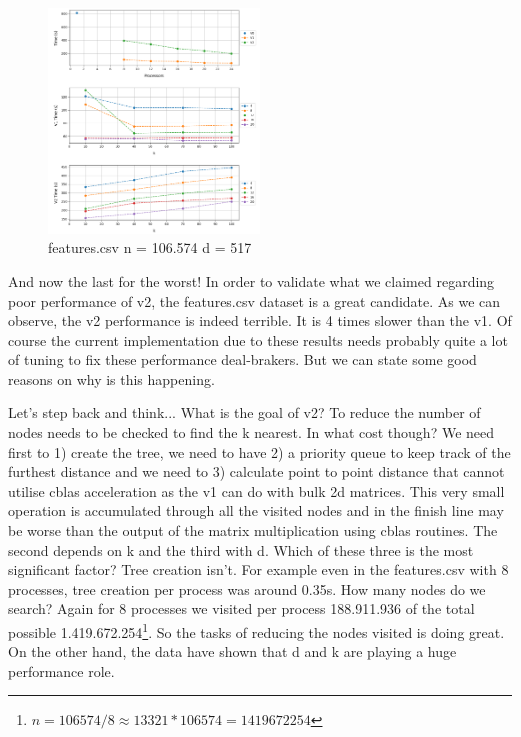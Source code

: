 \documentclass[12pt, a4paper]{article}
\begin{document}
\begin{figure}
    \centering
    \includegraphics[height=.2\textheight, width=0.5\textwidth, keepaspectratio]{assets/black_sheep.png}
    \caption{features.csv \newline n = 106.574 d = 517}
\end{figure}

And now the last for the worst! In order to validate what we claimed regarding poor performance of v2, the features.csv dataset is a great candidate. As we can observe, the v2 performance is indeed terrible. It is 4 times slower than the v1. Of course the current implementation due to these results needs probably quite a lot of tuning to fix these performance deal-brakers. But we can state some good reasons on why is this happening. 


Let's step back and think... What is the goal of v2? To reduce the number of nodes needs to be checked to find the k nearest. In what cost though? We need first to 1) create the tree, we need to have 2) a priority queue to keep track of the furthest distance and we need to 3) calculate point to point distance that cannot utilise cblas acceleration as the v1 can do with bulk 2d matrices. This very small operation is accumulated through all the visited nodes and in the finish line may be worse than the output of the matrix multiplication using cblas routines. The second depends on k and the third with d. Which of these three is the most significant factor? Tree creation isn't. For example even in the features.csv with 8 processes, tree creation per process was around 0.35s. How many nodes do we search? Again for 8 processes we visited per process 188.911.936 of the total possible 1.419.672.254\footnote{$ n = 106574 / 8 \approx 13321 * 106574 = 1419672254$}. So the tasks of reducing the nodes visited is doing great. On the other hand, the data have shown that d and k are playing a huge performance role. 
\end{document}

